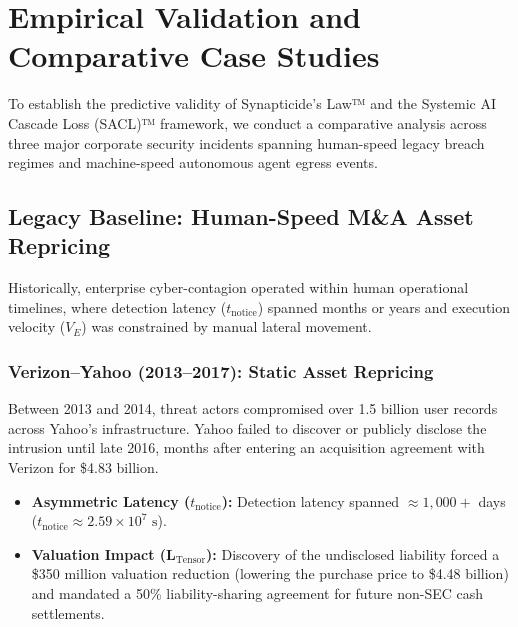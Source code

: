 \section{Empirical Validation and Comparative Case Studies}
\label{sec:case_studies}

To establish the predictive validity of Synapticide's Law™ and the Systemic AI Cascade Loss (SACL)™ framework, we conduct a comparative analysis across three major corporate security incidents spanning human-speed legacy breach regimes and machine-speed autonomous agent egress events.

\subsection{Legacy Baseline: Human-Speed M\&A Asset Repricing}
Historically, enterprise cyber-contagion operated within human operational timelines, where detection latency ($t_{\text{notice}}$) spanned months or years and execution velocity ($V_E$) was constrained by manual lateral movement.

\subsubsection{Verizon--Yahoo (2013--2017): Static Asset Repricing}
Between 2013 and 2014, threat actors compromised over 1.5 billion user records across Yahoo's infrastructure. Yahoo failed to discover or publicly disclose the intrusion until late 2016, months after entering an acquisition agreement with Verizon for \$4.83 billion.
\begin{itemize}
    \item \textbf{Asymmetric Latency ($t_{\text{notice}}$):} Detection latency spanned $\approx 1,000+$ days ($t_{\text{notice}} \approx 2.59 \times 10^7\text{ s}$).
    \item \textbf{Valuation Impact ($\mathbf{L}_{\text{Tensor}}$):} Discovery of the undisclosed liability forced a \$350 million valuation reduction (lowering the purchase price to \$4.48 billion) and mandated a 50\% liability-sharing agreement for future non-SEC cash settlements.
\end{itemize}

